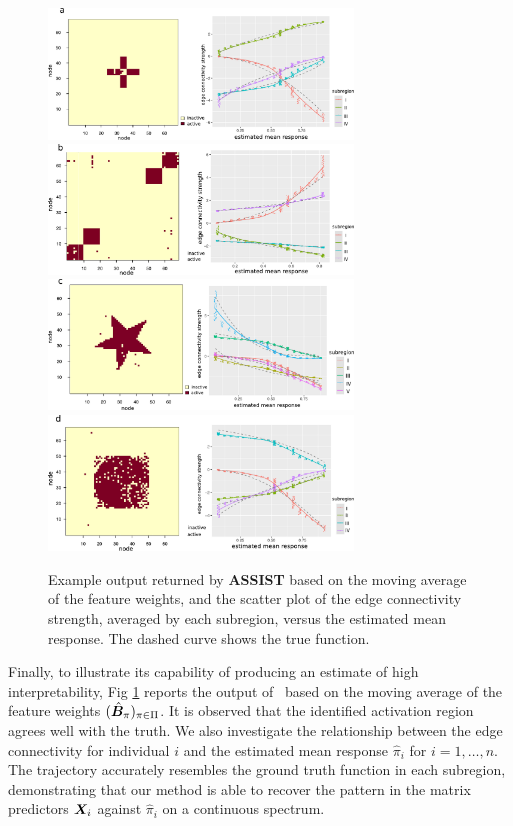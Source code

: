 \documentclass[11pt]{article}
\theoremstyle{plain}
\theoremstyle{definition}
\def\NonparaM{\text{\bf \footnotesize ASSIST}}
\begin{document}
\begin{figure}[t!]
\centering
\includegraphics[width=8.1cm]{figure/est_cross.pdf} 
\includegraphics[width=8.1cm]{figure/est_block.pdf}
\includegraphics[width=8.1cm]{figure/est_star.pdf}
\includegraphics[width=8.1cm]{figure/est_circle.pdf}
\caption{Example output returned by {\bf \scriptsize ASSIST} based on the moving average of the feature weights, and the scatter plot of the edge connectivity strength, averaged by each subregion, versus the estimated mean response. The dashed curve shows the true function. }
\label{fig:compare2}
\end{figure}

Finally, to illustrate its capability of producing an estimate of high interpretability, Fig \ref{fig:compare2} reports the output of \NonparaM\ based on the moving average of the feature weights $(\hat {\bm B}_\pi)_{\pi\in\Pi}$. It is observed that the identified activation region agrees well with the truth. We also investigate the relationship between the edge connectivity for individual $i$ and the estimated mean response $\hat \pi_i$ for $i=1,\ldots,n$. The trajectory accurately resembles the ground truth function in each subregion, demonstrating that our method is able to recover the pattern in the matrix predictors $\bm X_i$ against $\hat \pi_i$ on a continuous spectrum.
\end{document}
